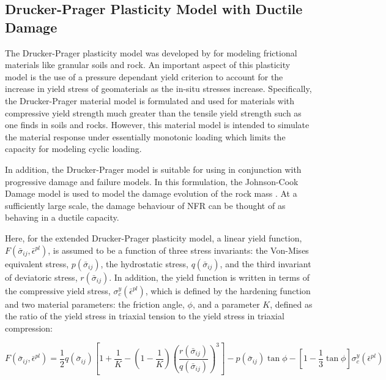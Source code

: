 \subsection{Drucker-Prager Plasticity Model with Ductile Damage}
The Drucker-Prager plasticity model was developed by \citet{drucker_implications_1950} for modeling frictional materials like granular soils and rock. An important aspect of this plasticity model is the use of a pressure dependant yield criterion to account for the increase in yield stress of geomaterials as the in-situ stresses increase. Specifically, the Drucker-Prager material model is formulated and used for materials with compressive yield strength much greater than the tensile yield strength such as one finds in soils and rocks. However, this material model is intended to simulate the material response under essentially monotonic loading which limits the capacity for modeling cyclic loading.

In addition, the Drucker-Prager model is suitable for using in conjunction with progressive damage and failure models. In this formulation, the Johnson-Cook Damage model is used to model the damage evolution of the rock mass \citep{Johnson_1985}. At a sufficiently large scale, the damage behaviour of NFR can be thought of as behaving in a ductile capacity. 

Here, for the extended Drucker-Prager plasticity model, a linear yield function, $F\left(\bar{\sigma}_{ij}, \bar{\epsilon}^{pl}\right)$, is assumed to be a function of three stress invariants: the Von-Mises equivalent stress, $p\left(\bar{\sigma}_{ij}\right)$, the hydrostatic stress, $q\left(\bar{\sigma}_{ij}\right)$, and the third invariant of deviatoric stress, $r\left(\bar{\sigma}_{ij}\right)$. In addition, the yield function is written in terms of the compressive yield stress, $\sigma_c^y\left(\bar{\epsilon}^{pl}\right)$, which is defined by the hardening function and two material parameters: the friction angle, $\phi$, and a parameter $K$, defined as the ratio of the yield stress in triaxial tension to the yield stress in triaxial compression:

\begin{equation}
F\left(\bar{\sigma}_{ij}, \bar{\epsilon}^{pl}\right)=\frac{1}{2}q\left(\bar{\sigma}_{ij}\right)\left [ 1+\frac{1}{K}-\left ( 1-\frac{1}{K} \right )\left ( \frac{r\left(\bar{\sigma}_{ij}\right)}{q\left(\bar{\sigma}_{ij}\right)} \right )^3 \right ]-p\left(\bar{\sigma}_{ij}\right)\tan\phi - \left[1-\frac{1}{3}\tan\phi \right]\sigma_c^y\left(\bar{\epsilon}^{pl}\right)
\label{eqn:const8c}
\end{equation}

